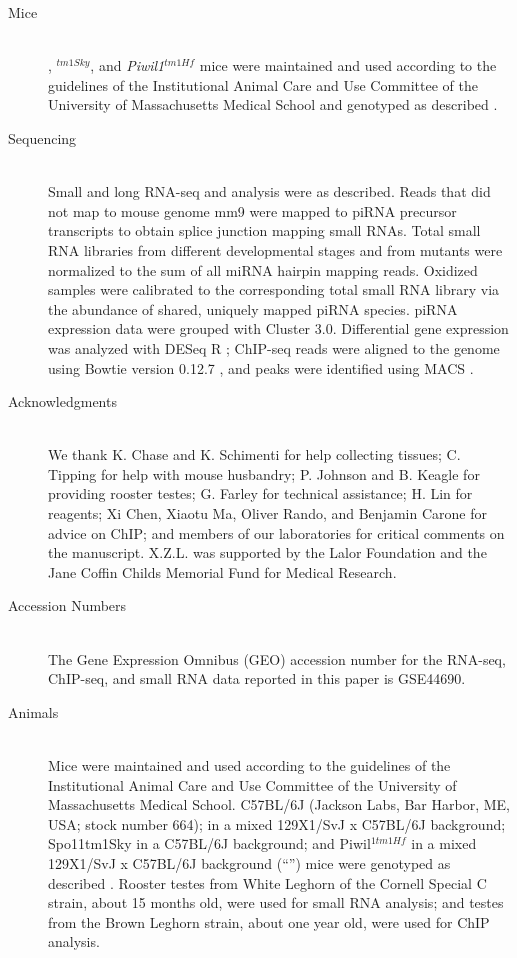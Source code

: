   \begin{description}
    \item[Mice] \hfill \\
    \mybrepro{}, \textit{\spo{}}$^{tm1Sky}$, and \textit{Piwil1}$^{tm1Hf}$ mice were maintained and used according to the guidelines of the Institutional Animal Care and Use Committee of the University of Massachusetts Medical School and genotyped as described \citep{Baudat2000c, Deng2002c, Bolcun-Filas2011}.

    \item[Sequencing] \hfill \\
    Small \citep{Ghildiyal2008, Seitz2008} and long RNA-seq \citep{Zhang2012a} and analysis \citep{Li2009a} were as described. Reads that did not map to mouse genome mm9 were mapped to piRNA precursor transcripts to obtain splice junction mapping small RNAs. Total small RNA libraries from different developmental stages and from mutants were normalized to the sum of all miRNA hairpin mapping reads. Oxidized samples were calibrated to the corresponding total small RNA library via the abundance of shared, uniquely mapped piRNA species. piRNA expression data were grouped with Cluster 3.0. Differential gene expression was analyzed with DESeq R \citep{Anders2010a}; ChIP-seq reads were aligned to the genome using Bowtie version 0.12.7 \citep{Langmead2009}, and peaks were identified using MACS \citep{Zhang2008}.

    \item[Acknowledgments] \hfill \\
    We thank K. Chase and K. Schimenti for help collecting tissues; C. Tipping for help with mouse husbandry; P. Johnson and B. Keagle for providing rooster testes; G. Farley for technical assistance; H. Lin for reagents; Xi Chen, Xiaotu Ma, Oliver Rando, and Benjamin Carone for advice on ChIP; and members of our laboratories for critical comments on the manuscript. X.Z.L. was supported by the Lalor Foundation and the Jane Coffin Childs Memorial Fund for Medical Research.

    \item[Accession Numbers] \hfill \\
    The Gene Expression Omnibus (GEO) accession number for the RNA-seq, ChIP-seq, and small RNA data reported in this paper is GSE44690.

    \item[Animals] \hfill \\
    Mice were maintained and used according to the guidelines of the Institutional Animal Care and Use Committee of the University of Massachusetts Medical School. C57BL/6J (Jackson Labs, Bar Harbor, ME, USA; stock number 664); \mybrepro{} in a mixed 129X1/SvJ x C57BL/6J background; Spo11tm1Sky in a C57BL/6J background; and Piwil$^{1tm1Hf}$ in a mixed 129X1/SvJ x C57BL/6J background (“\miwi{}”) mice were genotyped as described \citep{Baudat2000c, Deng2002c, Bolcun-Filas2011}. Rooster testes from White Leghorn of the Cornell Special C strain, about 15 months old, were used for small RNA analysis; and testes from the Brown Leghorn strain, about one year old, were used for ChIP analysis.


\end{description}
